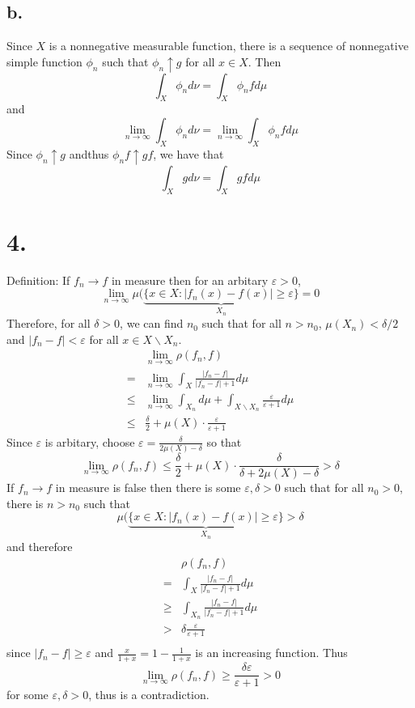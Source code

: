 \documentclass[11pt]{article}
\theoremstyle{mystyle}
\theoremstyle{definition}
\begin{document}
\subsection*{b.}
Since $X$ is a nonnegative measurable function, there is a sequence of nonnegative simple function $\phi_n$ such that $\phi_n \uparrow g$ for all $x \in X$. Then 
\[
  \int_X \phi_n d\nu = \int_X \phi_n f d\mu
\]
and 
\[
  \lim_{n \to \infty} \int_X \phi_n d\nu = \lim_{n \to \infty} \int_X \phi_n f d\mu
\]
Since $\phi_n \uparrow g$ andthus $\phi_n f \uparrow gf$, we have that 
\[
  \int_X g d\nu = \int_X gf d\mu
\]
\newpage
\section*{4.}
Definition: If $f_n \to f$ in measure then for an arbitary $\varepsilon > 0$,  
\[
  \lim_{n \to \infty} \mu(\underbrace{\{x \in X: |f_n(x) - f(x)| \ge \varepsilon\}}_{X_n} = 0
\]
Therefore, for all $\delta > 0$, we can find $n_0$ such that for all $n>n_0$, $\mu(X_n) < \delta/2$ and $|f_n-f| < \varepsilon$ for all $x \in X \backslash X_n$.  
\begin{align*} 
  &\lim_{n \to \infty} \rho(f_n, f) \\ 
  =& \lim_{n \to \infty} \int_X \displaystyle\frac{|f_n-f|}{|f_n - f| + 1} d\mu \\
  \le& \lim_{n \to \infty} \int_{X_n} d\mu + \int_{X\backslash X_n} \displaystyle\frac{\varepsilon}{\varepsilon + 1} d\mu \\
  \le& \displaystyle\frac{\delta}{2} + \mu(X) \cdot \displaystyle\frac{\varepsilon}{\varepsilon + 1}  
\end{align*}
Since $\varepsilon$ is arbitary, choose $\varepsilon = \displaystyle\frac{\delta}{2\mu(X)-\delta}$ so that 
\[
  \lim_{n \to \infty} \rho(f_n, f) \le \displaystyle\frac{\delta}{2} + \mu(X) \cdot \displaystyle\frac{\delta}{\delta + 2\mu(X) - \delta} > \delta
\]
If $f_n \to f$ in measure is false then there is some $\varepsilon, \delta > 0$ such that for all $n_0 > 0$, there is $n> n_0$ such that 
\[ 
  \mu(\underbrace{\{x \in X: |f_n(x) - f(x)| \ge \varepsilon\}}_{X_n} > \delta
\]
and therefore
\begin{align*}
  &\rho(f_n, f) \\
  =& \int_X \displaystyle\frac{|f_n-f|}{|f_n - f| + 1} d\mu \\
  \ge& \int_{X_n} \displaystyle\frac{|f_n-f|}{|f_n-f|+ 1} d\mu \\
  > & \delta \displaystyle\frac{\varepsilon}{\varepsilon + 1} \\
\end{align*} 
since $|f_n - f| \ge \varepsilon$ and $\displaystyle\frac{x}{1+x} = 1 - \displaystyle\frac{1}{1+x}$ is an increasing function. Thus 
\[
  \lim_{n \to \infty} \rho(f_n, f) \ge \displaystyle\frac{\delta \varepsilon}{\varepsilon+1} > 0
\]
for some $\varepsilon, \delta > 0$, thus is a contradiction. 
\newpage
\end{document}
